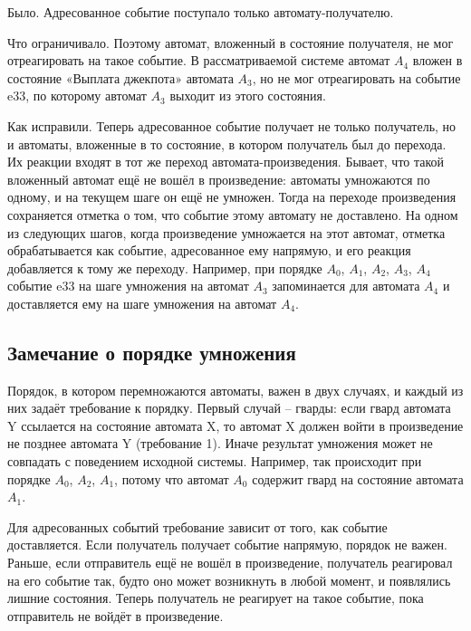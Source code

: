 \documentclass[12pt]{article}
\begin{document}
Было. Адресованное событие поступало только автомату-получателю.

Что ограничивало. Поэтому автомат, вложенный в состояние получателя, не мог отреагировать на такое событие. В рассматриваемой системе автомат $A_{4}$ вложен в состояние «Выплата джекпота» автомата $A_{3}$, но не мог отреагировать на событие e33, по которому автомат $A_{3}$ выходит из этого состояния.

Как исправили. Теперь адресованное событие получает не только получатель, но и автоматы, вложенные в то состояние, в котором получатель был до перехода. Их реакции входят в тот же переход автомата-произведения. Бывает, что такой вложенный автомат ещё не вошёл в произведение: автоматы умножаются по одному, и на текущем шаге он ещё не умножен. Тогда на переходе произведения сохраняется отметка о том, что событие этому автомату не доставлено. На одном из следующих шагов, когда произведение умножается на этот автомат, отметка обрабатывается как событие, адресованное ему напрямую, и его реакция добавляется к тому же переходу. Например, при порядке $A_{0}$, $A_{1}$, $A_{2}$, $A_{3}$, $A_{4}$ событие e33 на шаге умножения на автомат $A_{3}$ запоминается для автомата $A_{4}$ и доставляется ему на шаге умножения на автомат $A_{4}$.

\subsection*{Замечание о порядке умножения}

Порядок, в котором перемножаются автоматы, важен в двух случаях, и каждый из них задаёт требование к порядку. Первый случай – гварды: если гвард автомата Y ссылается на состояние автомата X, то автомат X должен войти в произведение не позднее автомата Y (требование 1). Иначе результат умножения может не совпадать с поведением исходной системы. Например, так происходит при порядке $A_{0}$, $A_{2}$, $A_{1}$, потому что автомат $A_{0}$ содержит гвард на состояние автомата $A_{1}$.

Для адресованных событий требование зависит от того, как событие доставляется. Если получатель получает событие напрямую, порядок не важен. Раньше, если отправитель ещё не вошёл в произведение, получатель реагировал на его событие так, будто оно может возникнуть в любой момент, и появлялись лишние состояния. Теперь получатель не реагирует на такое событие, пока отправитель не войдёт в произведение.
\end{document}
